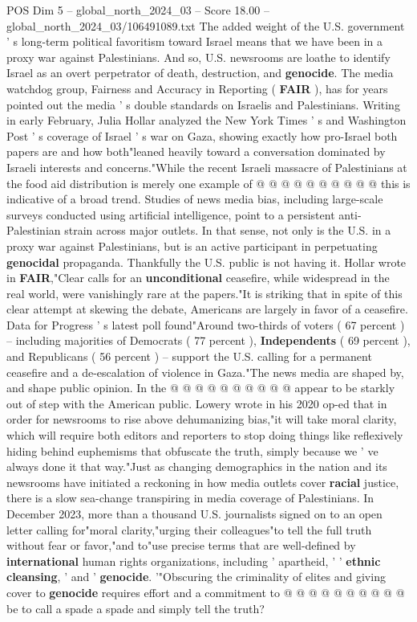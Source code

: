 \begin{textsample}{POS Dim 5 – global\_north\_2024\_03 – Score 18.00 – global\_north\_2024\_03/106491089.txt}
The added weight of the U.S. government ' s long-term political favoritism toward Israel means that we have been in a proxy war against Palestinians.
And so, U.S. newsrooms are loathe to identify Israel as an overt perpetrator of death, destruction, and \textbf{genocide}.
The media watchdog group, Fairness and Accuracy in Reporting ( \textbf{FAIR} ), has for years pointed out the media ' s double standards on Israelis and Palestinians.
Writing in early February, Julia Hollar analyzed the New York Times ' s and Washington Post ' s coverage of Israel ' s war on Gaza, showing exactly how pro-Israel both papers are and how both"leaned heavily toward a conversation dominated by Israeli interests and concerns."While the recent Israeli massacre of Palestinians at the food aid distribution is merely one example of @ @ @ @ @ @ @ @ @ @ this is indicative of a broad trend.
Studies of news media bias, including large-scale surveys conducted using artificial intelligence, point to a persistent anti-Palestinian strain across major outlets.
In that sense, not only is the U.S. in a proxy war against Palestinians, but is an active participant in perpetuating \textbf{genocidal} propaganda.
Thankfully the U.S. public is not having it.
Hollar wrote in \textbf{FAIR},"Clear calls for an \textbf{unconditional} ceasefire, while widespread in the real world, were vanishingly rare at the papers."It is striking that in spite of this clear attempt at skewing the debate, Americans are largely in favor of a ceasefire.
Data for Progress ' s latest poll found"Around two-thirds of voters ( 67 percent ) -- including majorities of Democrats ( 77 percent ), \textbf{Independents} ( 69 percent ), and Republicans ( 56 percent ) -- support the U.S. calling for a permanent ceasefire and a de-escalation of violence in Gaza."The news media are shaped by, and shape public opinion.
In the @ @ @ @ @ @ @ @ @ @ appear to be starkly out of step with the American public.
Lowery wrote in his 2020 op-ed that in order for newsrooms to rise above dehumanizing bias,"it will take moral clarity, which will require both editors and reporters to stop doing things like reflexively hiding behind euphemisms that obfuscate the truth, simply because we ' ve always done it that way."Just as changing demographics in the nation and its newsrooms have initiated a reckoning in how media outlets cover \textbf{racial} justice, there is a slow sea-change transpiring in media coverage of Palestinians.
In December 2023, more than a thousand U.S. journalists signed on to an open letter calling for"moral clarity,"urging their colleagues"to tell the full truth without fear or favor,"and to"use precise terms that are well-defined by \textbf{international} human rights organizations, including ' apartheid, ' ' \textbf{ethnic} \textbf{cleansing}, ' and ' \textbf{genocide}. '"Obscuring the criminality of elites and giving cover to \textbf{genocide} requires effort and a commitment to @ @ @ @ @ @ @ @ @ @ be to call a spade a spade and simply tell the truth?

\end{textsample}
